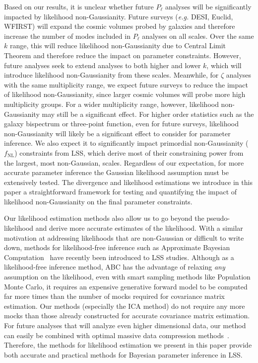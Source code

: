 \documentclass[12pt, letterpaper, preprint]{aastex6}
\newcommand{\lss}{{\small{LSS}}\xspace}
\newcommand{\ica}{{\small{ICA}}\xspace}
\begin{document}
{\color{red} Based on our results, it is unclear whether future $P_\ell$ 
analyses will be significantly impacted by likelihood non-Gaussianity.
Future surveys (\emph{e.g.} DESI, Euclid, WFIRST) will expand the cosmic 
volumes probed by galaxies and therefore increase the number of modes 
included in $P_\ell$ analyses on all scales. Over the same $k$ range, this 
will reduce likelihood non-Gaussianity due to Central Limit Theorem and 
therefore reduce the impact on parameter constraints. However, future 
analyses seek to extend analyses to both higher and lower $k$, which will 
introduce likelihood non-Gaussianity from these scales.}
Meanwhile, for $\zeta$ analyses with
the same multiplicity range, we expect future surveys to reduce the impact of
likelihood non-Gaussianity, since larger cosmic volumes will probe more
high multiplicity groups. For a wider multiplicity range, however, likelihood
non-Gaussianity may still be a significant effect. For higher order statistics
such as the galaxy bispectrum or three-point function, even for future surveys,
likelihood non-Gaussianity will likely be a significant effect to consider for
parameter inference. We also expect it to significantly impact primordial non-Gaussianity
($f_\mathrm{NL}$) constraints from \lss, which derive most of their constraining
power from the largest, most non-Gaussian, scales. Regardless of our expectation,
for more accurate parameter inference the Gaussian likelihood assumption must
be extensively tested. The divergence and likelihood estimations we introduce in 
this paper a straightforward framework for testing and quantifying the 
impact of likelihood non-Gaussianity on the final parameter constraints. 

Our likelihood estimation methods also allow us to go beyond the pseudo-likelihood 
and derive more accurate estimates of the likelihood. With a similar 
motivation at addressing likelihoods that are non-Gaussian or difficult to 
write down, methods for likelihood-free inference such as Approximate Bayesian 
Computation~\citep[ABC;][]{hahn2017b,kacprzak2017} have recently 
been introduced to \lss studies. 
Although as a likelihood-free inference method, ABC has the advantage 
of relaxing \emph{any} assumption on the likelihood, even with smart sampling methods 
like Population Monte Carlo, it requires an expensive generative forward 
model to be computed far more times than the number of mocks required for 
covariance matrix estimation. Our methods (especially the \ica method)
do not require any more mocks than those already constructed for accurate covariance
matrix estimation. 
{\color{red} 
For future analyses that will analyze even higher dimensional data, our 
method can easily be combined with optimal massive data 
compression methods~\citep[e.g.][]{heavens2017, alsing2018}.
}
Therefore, the methods for likelihood estimation we present
in this paper provide both accurate and practical methods for Bayesian 
parameter inference in \lss. 
\end{document}
